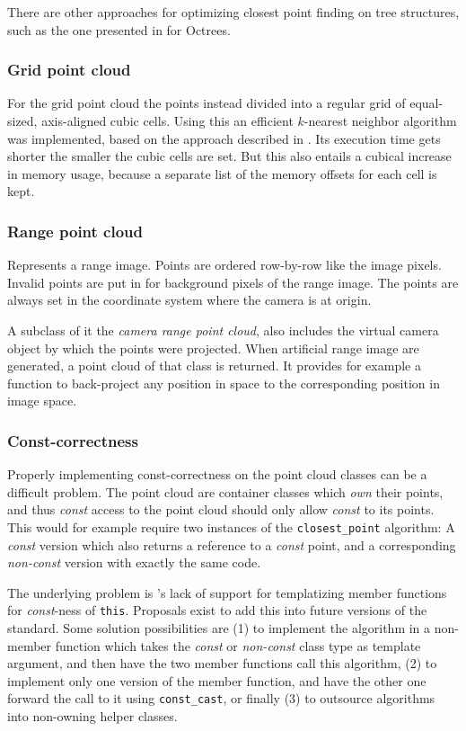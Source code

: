 There are other approaches for optimizing closest point finding on tree structures, such as the one presented in \cite{Kim2009} for Octrees.

\subsubsection{Grid point cloud}
For the grid point cloud the points instead divided into a regular grid of equal-sized, axis-aligned cubic cells. Using this an efficient $k$-nearest neighbor algorithm was implemented, based on the approach described in \cite{Sank2007}. Its execution time gets shorter the smaller the cubic cells are set. But this also entails a cubical increase in memory usage, because a separate list of the memory offsets for each cell is kept. 

\subsubsection{Range point cloud}
Represents a range image. Points are ordered row-by-row like the image pixels. Invalid points are put in for background pixels of the range image. The points are always set in the coordinate system where the camera is at origin.

A subclass of it the \emph{camera range point cloud}, also includes the virtual camera object by which the points were projected. When artificial range image are generated, a point cloud of that class is returned. It provides for example a function to back-project any position in space to the corresponding position in image space.

\subsubsection{Const-correctness}
Properly implementing const-correctness on the point cloud classes can be a difficult problem. The point cloud are container classes which \emph{own} their points, and thus \emph{const} access to the point cloud should only allow \emph{const} to its points. This would for example require two instances of the \verb&closest_point& algorithm: A \emph{const} version which also returns a reference to a \emph{const} point, and a corresponding \emph{non-const} version with exactly the same code.

The underlying problem is \cpp{}'s lack of support for templatizing member functions for \emph{const}-ness of \verb&this&. Proposals exist to add this into future versions of the \cpp{} standard. Some solution possibilities are (1) to implement the algorithm in a non-member function which takes the \emph{const} or \emph{non-const} class type as template argument, and then have the two member functions call this algorithm, (2) to implement only one version of the member function, and have the other one forward the call to it using \verb&const_cast&, or finally (3) to outsource algorithms into non-owning helper classes.

